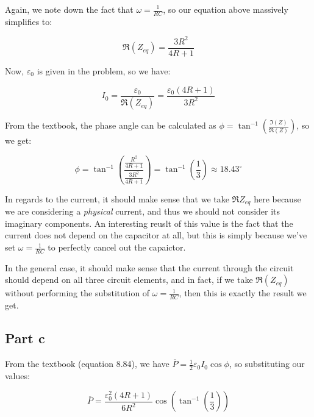 \documentclass{article}
\theoremstyle{definition}
\numberwithin{equation}{section}
\numberwithin{definition}{section}
\begin{document}
Again, we note down the fact that $\omega = \frac{1}{RC}$, so our equation above massively simplifies to:

\[ \Re(Z_{eq}) = \frac{3R^2}{4R+1}\]

Now, $\varepsilon_0$ is given in the problem, so we have:

\[ I_0 = \frac{\varepsilon_0}{\Re(Z_{eq})} = \frac{\varepsilon_0(4R+1)}{3R^2}\]

From the textbook, the phase angle can be calculated as $\phi = \tan^{-1}\left(\frac{\Im(Z)}{\Re(Z)}\right)$, so we get: 

\[\phi = \tan^{-1}\left(\frac{\frac{R^2}{4R+1}}{\frac{3R^2}{4R+1}}\right) = \tan^{-1}\left(\frac{1}{3}\right) \approx 18.43^\circ\]

In regards to the current, it should make sense that we take $\Re{Z_{eq}}$ here because we are considering a \textit{physical} current, and thus we should not consider its imaginary components. An interesting reuslt of this value is the fact that the current does not depend on the capacitor at all, but this is simply because we've set $\omega = \frac{1}{RC}$ to perfectly cancel out the capaictor. 

In the general case, it should make sense that the current through the circuit should depend on all three circuit elements, and in fact, if we take $\Re(Z_{eq})$ without performing the substitution of $\omega = \frac{1}{RC}$, then this is exactly the result we get. 

\subsection{Part c}

From the textbook (equation 8.84), we have $\overline{P} = \frac{1}{2}\varepsilon_0I_0 \cos \phi$, so substituting our values:

\[ \overline{P} = \frac{\varepsilon_0^2(4R+1)}{6R^2}\cos \left(\tan^{-1}\left(\frac{1}{3}\right)\right)\] 
\end{document}
